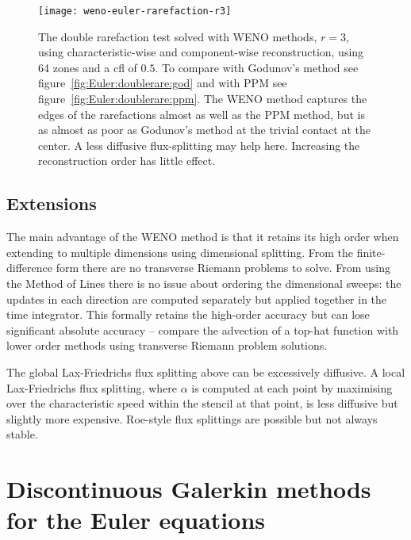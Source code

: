 \begin{figure}[t]
\centering
\texttt{[image: weno-euler-rarefaction-r3]}
\caption[WENO $r=3$ for the double rarefaction test]
{\label{fig:weno-euler-rarefaction-r3} The double rarefaction test solved with WENO methods, $r=3$, using characteristic-wise and component-wise reconstruction, using 64 zones and a cfl of $0.5$. To compare with Godunov's method see figure~\ref{fig:Euler:doublerare:god} and with PPM see figure~\ref{fig:Euler:doublerare:ppm}. The WENO method captures the edges of the rarefactions almost as well as the PPM method, but is as almost as poor as Godunov's method at the trivial contact at the center. A less diffusive flux-splitting may help here. Increasing the reconstruction order has little effect.\\
}
\end{figure}
%

\subsection{Extensions}

The main advantage of the WENO method is that it retains its high order when
extending to multiple dimensions using dimensional splitting. From the
finite-difference form there are no transverse Riemann problems to solve. From
using the Method of Lines there is no issue about ordering the dimensional
sweeps: the updates in each direction are computed separately but applied
together in the time integrator. This formally retains the high-order accuracy
but can lose significant absolute accuracy -- compare the advection of a
top-hat function with lower order methods using transverse Riemann problem
solutions.

The global Lax-Friedrichs flux splitting above can be excessively diffusive. A
local Lax-Friedrichs flux splitting, where $\alpha$ is computed at each point
by maximising over the characteristic speed within the stencil at that point, is
less diffusive but slightly more expensive. Roe-style flux splittings are
possible but not always stable.


\section{Discontinuous Galerkin methods for the Euler equations}
\label{sec:dg_euler}

